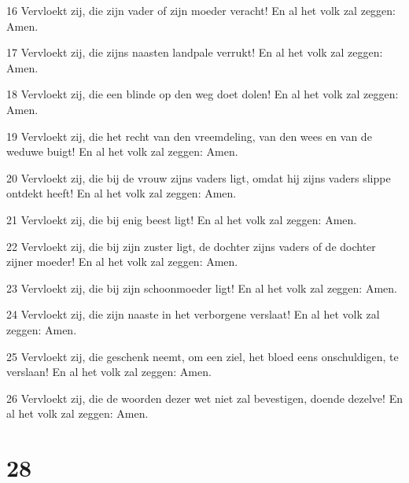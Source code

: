 \par 16 Vervloekt zij, die zijn vader of zijn moeder veracht! En al het volk zal zeggen: Amen.
\par 17 Vervloekt zij, die zijns naasten landpale verrukt! En al het volk zal zeggen: Amen.
\par 18 Vervloekt zij, die een blinde op den weg doet dolen! En al het volk zal zeggen: Amen.
\par 19 Vervloekt zij, die het recht van den vreemdeling, van den wees en van de weduwe buigt! En al het volk zal zeggen: Amen.
\par 20 Vervloekt zij, die bij de vrouw zijns vaders ligt, omdat hij zijns vaders slippe ontdekt heeft! En al het volk zal zeggen: Amen.
\par 21 Vervloekt zij, die bij enig beest ligt! En al het volk zal zeggen: Amen.
\par 22 Vervloekt zij, die bij zijn zuster ligt, de dochter zijns vaders of de dochter zijner moeder! En al het volk zal zeggen: Amen.
\par 23 Vervloekt zij, die bij zijn schoonmoeder ligt! En al het volk zal zeggen: Amen.
\par 24 Vervloekt zij, die zijn naaste in het verborgene verslaat! En al het volk zal zeggen: Amen.
\par 25 Vervloekt zij, die geschenk neemt, om een ziel, het bloed eens onschuldigen, te verslaan! En al het volk zal zeggen: Amen.
\par 26 Vervloekt zij, die de woorden dezer wet niet zal bevestigen, doende dezelve! En al het volk zal zeggen: Amen.

\chapter{28}

